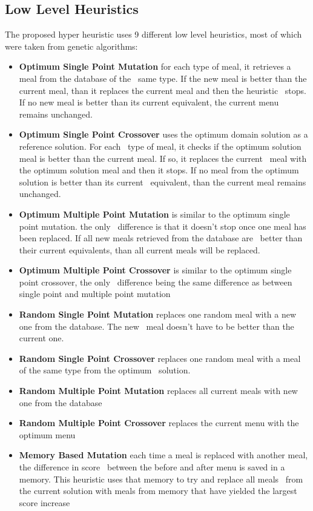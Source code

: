 \subsection{Low Level Heuristics}
\label{subsec:analysis-llh}
The proposed hyper heuristic uses 9 different low level heuristics, most of which were taken from genetic algorithms:
\begin{itemize}
    \item \textbf{Optimum Single Point Mutation} for each type of meal, it retrieves a meal from the database of the \
same type. If the new meal is better than the current meal, than it replaces the current meal and then the heuristic \
stops. If no new meal is better than its current equivalent, the current menu remains unchanged.
    \item \textbf{Optimum Single Point Crossover} uses the optimum domain solution as a reference solution. For each \
type of meal, it checks if the optimum solution meal is better than the current meal. If so, it replaces the current \
meal with the optimum solution meal and then it stops. If no meal from the optimum solution is better than its current \
equivalent, than the current meal remains unchanged.
    \item \textbf{Optimum Multiple Point Mutation} is similar to the optimum single point mutation. the only \
difference is that it doesn't stop once one meal has been replaced. If all new meals retrieved from the database are \
better than their current equivalents, than all current meals will be replaced.
    \item \textbf{Optimum Multiple Point Crossover} is similar to the optimum single point crossover, the only \
difference being the same difference as between single point and multiple point mutation
    \item \textbf{Random Single Point Mutation} replaces one random meal with a new one from the database. The new \
meal doesn't have to be better than the current one.
    \item \textbf{Random Single Point Crossover} replaces one random meal with a meal of the same type from the optimum \
solution.
    \item \textbf{Random Multiple Point Mutation} replaces all current meals with new one from the database
    \item \textbf{Random Multiple Point Crossover} replaces the current menu with the optimum menu
    \item \textbf{Memory Based Mutation} each time a meal is replaced with another meal, the difference in score \
between the before and after menu is saved in a memory. This heuristic uses that memory to try and replace all meals \
from the current solution with meals from memory that have yielded the largest score increase
\end{itemize}

